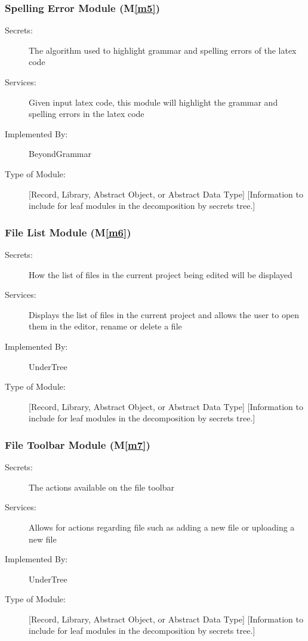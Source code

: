 \documentclass[12pt, titlepage]{article}
\newcommand{\mref}[1]{M\ref{#1}}
\begin{document}
	\subsubsection{Spelling Error Module (\mref{m5})}
	
	\begin{description}
		\item[Secrets:] The algorithm used to highlight grammar and spelling errors of the latex code
		\item[Services:] Given input latex code, this module will highlight the grammar and spelling errors in the latex code
		\item[Implemented By:] BeyondGrammar
		\item[Type of Module:] [Record, Library, Abstract Object, or Abstract Data Type]
		[Information to include for leaf modules in the decomposition by secrets tree.]
	\end{description}
	
	\subsubsection{File List Module (\mref{m6})}
	
	\begin{description}
		\item[Secrets:] How the list of files in the current project being edited will be displayed
		\item[Services:] Displays the list of files in the current project and allows the user to open them in the editor, rename or delete a file
		\item[Implemented By:] UnderTree
		\item[Type of Module:] [Record, Library, Abstract Object, or Abstract Data Type]
		[Information to include for leaf modules in the decomposition by secrets tree.]
	\end{description}
	
	\subsubsection{File Toolbar Module (\mref{m7})}
	
	\begin{description}
		\item[Secrets:] The actions available on the file toolbar
		\item[Services:] Allows for actions regarding file such as adding a new file or uploading a new file
		\item[Implemented By:] UnderTree
		\item[Type of Module:] [Record, Library, Abstract Object, or Abstract Data Type]
		[Information to include for leaf modules in the decomposition by secrets tree.]
	\end{description}
	
\end{document}

